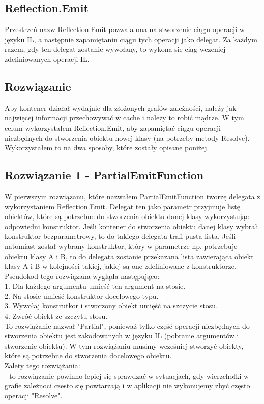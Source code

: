 \documentclass[12pt]{article}
\begin{document}
\subsection{Reflection.Emit}
Przestrzeń nazw Reflection.Emit pozwala ona na stworzenie ciągu operacji w języku IL, a następnie zapamiętaniu ciągu tych operacji jako delegat. Za każdym razem, gdy ten delegat zostanie wywołany, to wykona się ciąg wczeniej zdefiniowanych operacji IL.


\subsection{Rozwiązanie}
Aby kontener działał wydajnie dla złożonych grafów zależności, należy jak najwięcej informacji przechowywać w cache i należy to robić mądrze. W tym celum wykorzystałem Reflection.Emit, aby zapamiętać ciągu operacji niezbędnych do stworzenia obiektu nowej klasy (na potrzeby metody Resolve). Wykorzystałem to na dwa sposoby, które zostały opisane poniżej.


\subsection{Rozwiązanie 1 - PartialEmitFunction}
W pierwszym rozwiązanu, które nazwałem PartialEmitFunction tworzę delegata z wykorzystaniem Reflection.Emit. Delegat ten jako parametr przyjmuje listę obiektów, które są potrzebne do stworzenia obiektu danej klasy wykorzystując odpowiedni konstruktor. Jeśli kontener do stworzenia obiektu danej klasy wybrał konstruktor bezparametrowy, to do takiego delegata trafi pusta lista. Jeśli natomiast został wybrany konstruktor, który w parametrze np. potrzebuje obiektu klasy A i B, to do delegata zostanie przekazana lista zawierająca obiekt klasy A i B w kolejności takiej, jakiej są one zdefiniowane z konstruktorze.\\
Pseudokod tego rozwiązana wygląda następująco:\\
1. Dla każdego argumentu umieść ten argument na stosie.\\
2. Na stosie umieść konstruktor docelowego typu.\\
3. Wywołaj konstrutkor i stworzony obiekt umięść na szczycie stosu.\\
4. Zwróć obiekt ze szczytu stosu.\\
To rozwiążanie nazwał "Partial", ponieważ tylko część operacji niezbędnych do stworzenia obiektu jest zakodowanych w języku IL (pobranie argumentów i stworzenie obiektu). W tym rozwiążaniu musimy wcześniej stworzyć obiekty, które są potrzebne do stworzenia docelowego obiektu.\\
Zalety tego rozwiążania:\\
- to rozwiązanie powinno lepiej się sprawdzać w sytuacjach, gdy wierzchołki w grafie zależnoci czesto się powtarzają i w aplikacji nie wykonujemy zbyć często operacji "Resolve".
\end{document}
